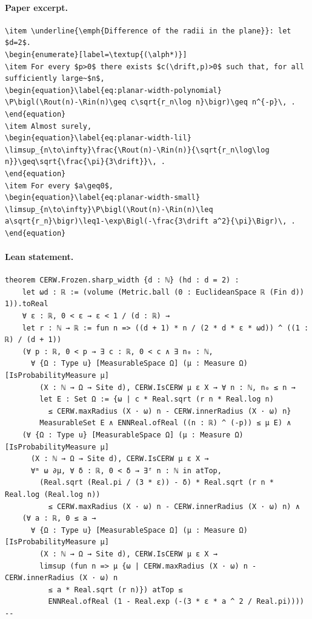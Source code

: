 \paragraph{Paper excerpt.}
\begin{verbatim}
\item \underline{\emph{Difference of the radii in the plane}}: let $d=2$.
\begin{enumerate}[label=\textup{(\alph*)}]
\item For every $p>0$ there exists $c(\drift,p)>0$ such that, for all sufficiently large~$n$,
\begin{equation}\label{eq:planar-width-polynomial}
\P\bigl(\Rout(n)-\Rin(n)\geq c\sqrt{r_n\log n}\bigr)\geq n^{-p}\, .
\end{equation}
\item Almost surely,
\begin{equation}\label{eq:planar-width-lil}
\limsup_{n\to\infty}\frac{\Rout(n)-\Rin(n)}{\sqrt{r_n\log\log n}}\geq\sqrt{\frac{\pi}{3\drift}}\, .
\end{equation}
\item For every $a\geq0$,
\begin{equation}\label{eq:planar-width-small}
\limsup_{n\to\infty}\P\bigl(\Rout(n)-\Rin(n)\leq a\sqrt{r_n}\bigr)\leq1-\exp\Bigl(-\frac{3\drift a^2}{\pi}\Bigr)\, .
\end{equation}
\end{verbatim}
\paragraph{Lean statement.}
\begin{verbatim}
theorem CERW.Frozen.sharp_width {d : ℕ} (hd : d = 2) :
    let ωd : ℝ := (volume (Metric.ball (0 : EuclideanSpace ℝ (Fin d)) 1)).toReal
    ∀ ε : ℝ, 0 < ε → ε < 1 / (d : ℝ) →
    let r : ℕ → ℝ := fun n => ((d + 1) * n / (2 * d * ε * ωd)) ^ ((1 : ℝ) / (d + 1))
    (∀ p : ℝ, 0 < p → ∃ c : ℝ, 0 < c ∧ ∃ n₀ : ℕ,
      ∀ {Ω : Type u} [MeasurableSpace Ω] (μ : Measure Ω) [IsProbabilityMeasure μ]
        (X : ℕ → Ω → Site d), CERW.IsCERW μ ε X → ∀ n : ℕ, n₀ ≤ n →
        let E : Set Ω := {ω | c * Real.sqrt (r n * Real.log n)
          ≤ CERW.maxRadius (X · ω) n - CERW.innerRadius (X · ω) n}
        MeasurableSet E ∧ ENNReal.ofReal ((n : ℝ) ^ (-p)) ≤ μ E) ∧
    (∀ {Ω : Type u} [MeasurableSpace Ω] (μ : Measure Ω) [IsProbabilityMeasure μ]
      (X : ℕ → Ω → Site d), CERW.IsCERW μ ε X →
      ∀ᵐ ω ∂μ, ∀ δ : ℝ, 0 < δ → ∃ᶠ n : ℕ in atTop,
        (Real.sqrt (Real.pi / (3 * ε)) - δ) * Real.sqrt (r n * Real.log (Real.log n))
          ≤ CERW.maxRadius (X · ω) n - CERW.innerRadius (X · ω) n) ∧
    (∀ a : ℝ, 0 ≤ a →
      ∀ {Ω : Type u} [MeasurableSpace Ω] (μ : Measure Ω) [IsProbabilityMeasure μ]
        (X : ℕ → Ω → Site d), CERW.IsCERW μ ε X →
        limsup (fun n => μ {ω | CERW.maxRadius (X · ω) n - CERW.innerRadius (X · ω) n
          ≤ a * Real.sqrt (r n)}) atTop ≤
          ENNReal.ofReal (1 - Real.exp (-(3 * ε * a ^ 2 / Real.pi))))
--
\end{verbatim}
